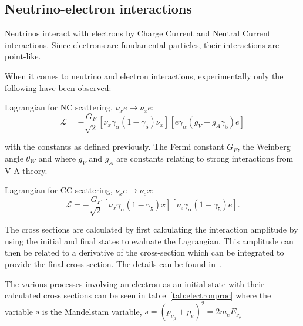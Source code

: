 \subsection{Neutrino-electron interactions}



Neutrinos interact with electrons by Charge Current and Neutral Current interactions. Since electrons are fundamental particles, their interactions are point-like.

When it comes to neutrino and electron interactions, experimentally only the following have been observed:

Lagrangian for NC scattering, $\nu_x e \rightarrow \nu_x e$:
\begin{equation}
\mathcal{L}=-\frac{G_F}{\sqrt{2}} \left[ \bar{\nu_x}\gamma_\alpha (1-\gamma_5)\nu_x \right] \left[ \bar{e} \gamma_\alpha (g_V-g_A \gamma_5)e \right]
\end{equation}

with the constants as defined previously. The Fermi constant $G_F$, the Weinberg angle $\theta_W$ and where $g_V$ and $g_A$ are constants relating to strong interactions from V-A theory.

Lagrangian for CC scattering, $\nu_x e \rightarrow \nu_e x$:
\begin{equation}
\mathcal{L}=-\frac{G_F}{\sqrt{2}} \left[ \bar{\nu_x}\gamma_\alpha (1-\gamma_5)x\right] \left[ \bar{\nu_e}\gamma_\alpha (1-\gamma_5)e \right].
\end{equation}

The cross sections are calculated by first calculating the  interaction amplitude by using the initial and final states to evaluate the Lagrangian. This amplitude can then be related to a derivative of the cross-section which can be integrated to provide the final cross section. The details can be found in~\cite{3Peskin}.

The various processes involving an electron as an initial state with their calculated cross sections can be seen in table~\ref{tab:electronproc} where the variable $s$ is the Mandelstam variable, $s=(p_{\nu_\mu} + p_e)^2 = 2m_e E_{\nu_\mu}$


